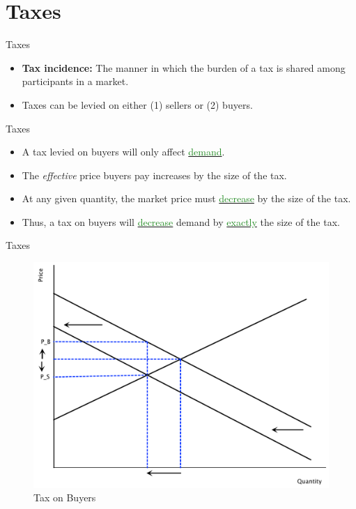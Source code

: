 \documentclass[xcolor={dvipsnames},pdf, hyperref={colorlinks=true, citecolor=ForestGreen, linkcolor=BlueViolet, urlcolor=Magenta}]{beamer}
\newcommand{\defn}[1]{\textbf{#1}}
\newcommand{\dd}[1]{{\underline{\textcolor{ForestGreen}{#1}}}}
\begin{document}
\section{Taxes}

\begin{frame}{Taxes}
	\begin{itemize}
		\item \defn{Tax incidence:} The manner in which the burden of a tax is shared among participants in a market. 
		\item Taxes can be levied on either (1) sellers or (2) buyers. 
	\end{itemize}	
\end{frame}

\begin{frame}{Taxes}
\begin{itemize}
	\item A tax levied on buyers will only affect \dd{demand}. 
	\item The \textit{effective} price buyers pay increases by the size of the tax. 
	\item At any given quantity, the market price must \dd{decrease} by the size of the tax.
	\item Thus, a tax on buyers will \dd{decrease} demand by \dd{exactly} the size of the tax.
	
\end{itemize}
\end{frame}

\begin{frame}{Taxes}
		\begin{figure}
			\centering
		\includegraphics[scale=.30]{plot41.pdf}
			\caption{Tax on Buyers}
		\end{figure}
\end{frame}
\end{document}
